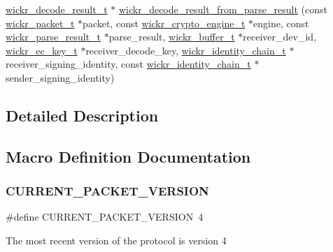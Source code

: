\begin{DoxyCompactItemize}
\item 
\hyperlink{structwickr__decode__result}{wickr\+\_\+decode\+\_\+result\+\_\+t} $\ast$ \hyperlink{group__wickr__protocol_ga32d9da2e10d1d653b2ac894d50aaedb0}{wickr\+\_\+decode\+\_\+result\+\_\+from\+\_\+parse\+\_\+result} (const \hyperlink{structwickr__packet}{wickr\+\_\+packet\+\_\+t} $\ast$packet, const \hyperlink{structwickr__crypto__engine}{wickr\+\_\+crypto\+\_\+engine\+\_\+t} $\ast$engine, const \hyperlink{structwickr__parse__result}{wickr\+\_\+parse\+\_\+result\+\_\+t} $\ast$parse\+\_\+result, \hyperlink{structwickr__buffer}{wickr\+\_\+buffer\+\_\+t} $\ast$receiver\+\_\+dev\+\_\+id, \hyperlink{structwickr__ec__key}{wickr\+\_\+ec\+\_\+key\+\_\+t} $\ast$receiver\+\_\+decode\+\_\+key, \hyperlink{structwickr__identity__chain}{wickr\+\_\+identity\+\_\+chain\+\_\+t} $\ast$receiver\+\_\+signing\+\_\+identity, const \hyperlink{structwickr__identity__chain}{wickr\+\_\+identity\+\_\+chain\+\_\+t} $\ast$sender\+\_\+signing\+\_\+identity)
\end{DoxyCompactItemize}


\subsection{Detailed Description}


\subsection{Macro Definition Documentation}
\mbox{\label{group__wickr__protocol_ga89ff9f93c5494db53d3ff27353989862}} 
\subsubsection{\texorpdfstring{C\+U\+R\+R\+E\+N\+T\+\_\+\+P\+A\+C\+K\+E\+T\+\_\+\+V\+E\+R\+S\+I\+ON}{CURRENT\_PACKET\_VERSION}}
{\footnotesize\ttfamily \#define C\+U\+R\+R\+E\+N\+T\+\_\+\+P\+A\+C\+K\+E\+T\+\_\+\+V\+E\+R\+S\+I\+ON~4}

The most recent version of the protocol is version 4 \mbox{\label{group__wickr__protocol_gad269883d0b8b26c4fa52da595ef5ddf7}} 
